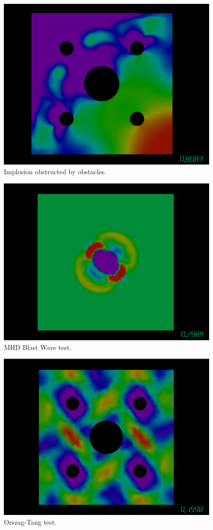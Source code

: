 \documentclass[12pt]{article}
\begin{document}
\begin{figure}[H!]
\centering
\includegraphics[width=0.8\linewidth]{ImplosionBear}
\caption{Implosion obstructed by obstacles.}
\label{fig:implosion2}
\end{figure}

\begin{figure}[H!]
\centering
\includegraphics[width=0.8\linewidth]{BlastWave}
\caption{MHD Blast Wave test.}
\label{fig:blast}
\end{figure}

\begin{figure}[H!]
\centering
\includegraphics[width=0.8\linewidth]{OrszagTang}
\caption{Orszag-Tang test.}
\label{fig:ot}
\end{figure}
\end{document}
